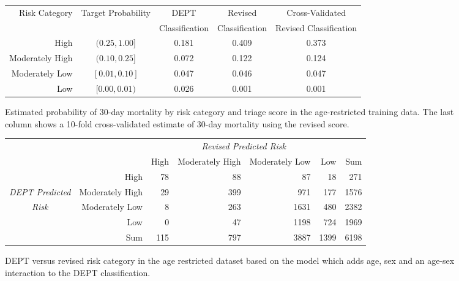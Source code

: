 \begin{figure}[ht]
\centering
\begin{tabular}{rcccc}
  \hline
 Risk Category  & Target Probability & DEPT  & Revised & Cross-Validated \\
  & & Classification & Classification &  Revised Classification \\
  \hline
High &  $(0.25, 1.00]$ & 0.181 & 0.409 & 0.373 \\
Moderately High & $(0.10, 0.25]$ & 0.072 & 0.122 & 0.124\\
Moderately Low & $[0.01, 0.10]$ & 0.047 & 0.046 & 0.047 \\
Low &  $[0.00, 0.01)$ & 0.026 & 0.001 & 0.001 \\
   \hline
\end{tabular}
\caption{Estimated probability of 30-day mortality by risk category and triage score in the age-restricted training data.  The last column shows a 10-fold cross-validated estimate of 30-day mortality using the revised score.}
\label{figure:mort30RatesByColorPrimary}
\end{figure}

\begin{figure}[ht]
\centering
\begin{tabular}{crrrrrr}
  \hline
  & &   \multicolumn{4}{c}{\textit{Revised Predicted Risk}} & \\
  & & High & Moderately High & Moderately Low & Low & Sum \\ 
  \hline
& High & 78 & 88 & 87 & 18 & 271 \\ 
  \textit{DEPT Predicted} & Moderately High & 29 & 399 & 971 & 177 & 1576 \\ 
  \textit{Risk} & Moderately Low & 8 & 263 & 1631 & 480 & 2382 \\ 
  & Low & 0 & 47 & 1198 & 724 & 1969 \\ 
  & Sum & 115 & 797 & 3887 & 1399 & 6198 \\ 
   \hline
\end{tabular}
\caption{DEPT versus  revised risk category in the age 
       restricted dataset based on the 
       model which adds age, sex and an age-sex interaction to the DEPT 
       classification.} 
\label{figure:DEPTColorVsNewColorPrimary}
\end{figure}

